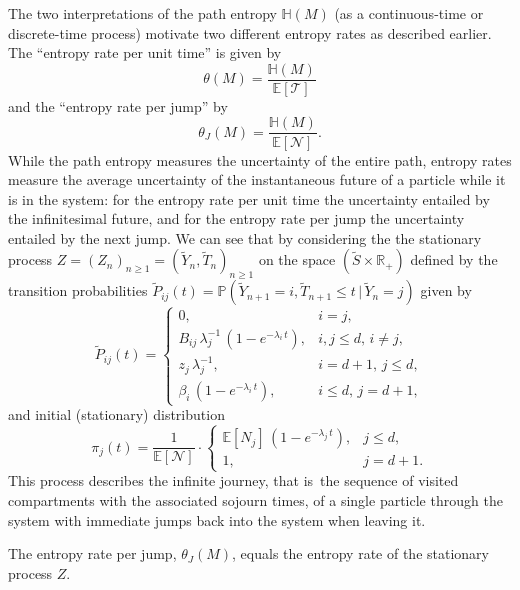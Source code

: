 \documentclass[smallextended]{svjour3}
\newcommand{\R}{\mathbb{R}}
\renewcommand{\P}{\mathbb{P}}
\newcommand{\E}{\mathbb{E}}
\newcommand{\TT}{\mathcal{T}}
\renewcommand{\H}{\mathbb{H}}
\newcommand{\ie}{that is}
\renewcommand{\emph}[1]{``#1''}
\begin{document}
The two interpretations of the path entropy $\H(M)$ (as a continuous-time or discrete-time process) motivate two different entropy rates as described earlier.
The \emph{entropy rate per unit time} is given by
\begin{equation}
  \theta(M) = \frac{\H(M)}{\E\left[\TT\right]}
\end{equation}
and the \emph{entropy rate per jump} by
\begin{equation}
  \theta_J(M) = \frac{\H(M)}{\E\left[\mathcal{N}\right]}.
\end{equation}
While the path entropy measures the uncertainty of the entire path, entropy rates measure the average uncertainty of the instantaneous future of a particle while it is in the system: for the entropy rate per unit time the uncertainty entailed by the infinitesimal future, and for the entropy rate per jump the uncertainty entailed by the next jump. 
We can see that by considering the the stationary process
$Z=(Z_n)_{n\geq1}=(\widetilde{Y}_n,\widetilde{T}_n)_{n\geq1}$ on the space $(\widetilde{S}\times\R_+)$ defined by the transition probabilities $\widetilde{P}_{ij}(t) = \P(\widetilde{Y}_{n+1}=i, \widetilde{T}_{n+1}\leq t\,|\,\widetilde{Y}_n=j)$ given by
\begin{equation}
  \widetilde{P}_{ij}(t) = 
  \begin{cases}
     0, & i=j,\\
     B_{ij}\,\lambda_j^{-1}\,(1-e^{-\lambda_i\,t}), & i,j\leq d,\,i\neq j,\\
     z_j\,\lambda_j^{-1}, & i=d+1,\,j\leq d,\\
     \beta_i\,(1-e^{-\lambda_i\,t}), & i\leq d,\,j=d+1,
  \end{cases}
\end{equation}
and initial (stationary) distribution
\begin{equation}
  \pi_j(t) = \frac{1}{\E\left[\mathcal{N}\right]}\cdot
  \begin{cases}
    \E\left[N_j\right]\,(1-e^{-\lambda_j\,t}), & j\leq d,\\
    1, & j=d+1.
  \end{cases}
\end{equation}
This process describes the infinite journey, \ie\ the sequence of visited compartments with the associated sojourn times, of a single particle through the system with immediate jumps back into the system when leaving it.

\begin{myproposition}
  The entropy rate per jump, $\theta_J(M)$, equals the entropy rate of the stationary process $Z$.
\end{myproposition}
\end{document}
